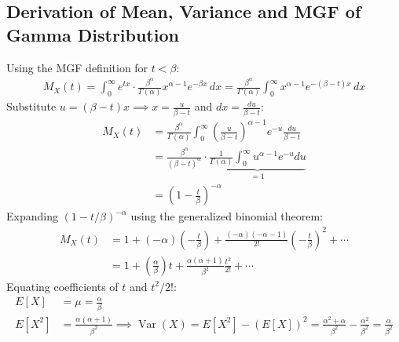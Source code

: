 \documentclass[12pt,a4paper]{article}
\begin{document}
\subsection{Derivation of Mean, Variance and MGF of Gamma Distribution}
\begin{tcolorbox}[examplebox, title={\textbf{Rigorous Derivation: Moments of Gamma Distribution}}]
Using the MGF definition for $t < \beta$:
\begin{align}
  M_X(t) = \int_0^\infty e^{tx} \cdot \frac{\beta^\alpha}{\Gamma(\alpha)} x^{\alpha-1} e^{-\beta x} \, dx = \frac{\beta^\alpha}{\Gamma(\alpha)} \int_0^\infty x^{\alpha-1} e^{-(\beta - t)x} \, dx
\end{align}
Substitute $u = (\beta - t)x \implies x = \frac{u}{\beta - t}$ and $dx = \frac{du}{\beta - t}$:
\begin{equation}
  \begin{aligned}
    M_X(t) &= \frac{\beta^\alpha}{\Gamma(\alpha)} \int_0^\infty \left(\frac{u}{\beta - t}\right)^{\alpha-1} e^{-u} \frac{du}{\beta - t} \\[3pt]
    &= \frac{\beta^\alpha}{(\beta - t)^\alpha} \cdot \underbrace{\frac{1}{\Gamma(\alpha)} \int_0^\infty u^{\alpha-1} e^{-u} du}_{= 1} \\[3pt]
    &= \left(1 - \frac{t}{\beta}\right)^{-\alpha}
  \end{aligned}
\end{equation}
Expanding $(1 - t/\beta)^{-\alpha}$ using the generalized binomial theorem:
\begin{align}
  M_X(t) &= 1 + (-\alpha)\left(-\frac{t}{\beta}\right) + \frac{(-\alpha)(-\alpha-1)}{2!} \left(-\frac{t}{\beta}\right)^2 + \cdots \nonumber \\[3pt]
         &= 1 + \left(\frac{\alpha}{\beta}\right) t + \frac{\alpha(\alpha+1)}{\beta^2} \frac{t^2}{2!} + \cdots
\end{align}
Equating coefficients of $t$ and $t^2/2!$:
\begin{align}
  E[X] &= \mu = \frac{\alpha}{\beta} \\[3pt]
  E[X^2] &= \frac{\alpha(\alpha+1)}{\beta^2} \implies \operatorname{Var}(X) = E[X^2] - (E[X])^2 = \frac{\alpha^2 + \alpha}{\beta^2} - \frac{\alpha^2}{\beta^2} = \frac{\alpha}{\beta^2}
\end{align}
\end{tcolorbox}
\end{document}
